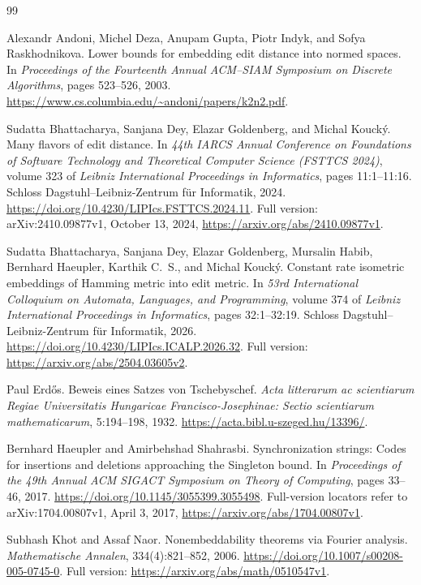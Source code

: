 \begin{thebibliography}{99}

Alexandr Andoni, Michel Deza, Anupam Gupta, Piotr Indyk, and Sofya Raskhodnikova.
Lower bounds for embedding edit distance into normed spaces.
In \emph{Proceedings of the Fourteenth Annual ACM--SIAM Symposium on Discrete
Algorithms}, pages 523--526, 2003.
\url{https://www.cs.columbia.edu/~andoni/papers/k2n2.pdf}.

Sudatta Bhattacharya, Sanjana Dey, Elazar Goldenberg, and Michal Kouck\'y.
Many flavors of edit distance.
In \emph{44th IARCS Annual Conference on Foundations of Software Technology
and Theoretical Computer Science (FSTTCS 2024)}, volume 323 of
\emph{Leibniz International Proceedings in Informatics}, pages 11:1--11:16.
Schloss Dagstuhl--Leibniz-Zentrum f\"ur Informatik, 2024.
\url{https://doi.org/10.4230/LIPIcs.FSTTCS.2024.11}.
Full version: arXiv:2410.09877v1, October 13, 2024,
\url{https://arxiv.org/abs/2410.09877v1}.

Sudatta Bhattacharya, Sanjana Dey, Elazar Goldenberg, Mursalin Habib,
Bernhard Haeupler, Karthik C.~S., and Michal Kouck\'y.
Constant rate isometric embeddings of Hamming metric into edit metric.
In \emph{53rd International Colloquium on Automata, Languages, and Programming},
volume 374 of \emph{Leibniz International Proceedings in Informatics},
pages 32:1--32:19. Schloss Dagstuhl--Leibniz-Zentrum f\"ur Informatik, 2026.
\url{https://doi.org/10.4230/LIPIcs.ICALP.2026.32}.
Full version: \url{https://arxiv.org/abs/2504.03605v2}.

Paul Erd\H{o}s.
Beweis eines Satzes von Tschebyschef.
\emph{Acta litterarum ac scientiarum Regiae Universitatis Hungaricae
Francisco-Josephinae: Sectio scientiarum mathematicarum}, 5:194--198, 1932.
\url{https://acta.bibl.u-szeged.hu/13396/}.

Bernhard Haeupler and Amirbehshad Shahrasbi.
Synchronization strings: Codes for insertions and deletions approaching the
Singleton bound.
In \emph{Proceedings of the 49th Annual ACM SIGACT Symposium on Theory of
Computing}, pages 33--46, 2017.
\url{https://doi.org/10.1145/3055399.3055498}.
Full-version locators refer to arXiv:1704.00807v1, April 3, 2017,
\url{https://arxiv.org/abs/1704.00807v1}.

Subhash Khot and Assaf Naor.
Nonembeddability theorems via Fourier analysis.
\emph{Mathematische Annalen}, 334(4):821--852, 2006.
\url{https://doi.org/10.1007/s00208-005-0745-0}.
Full version: \url{https://arxiv.org/abs/math/0510547v1}.


\end{thebibliography}
